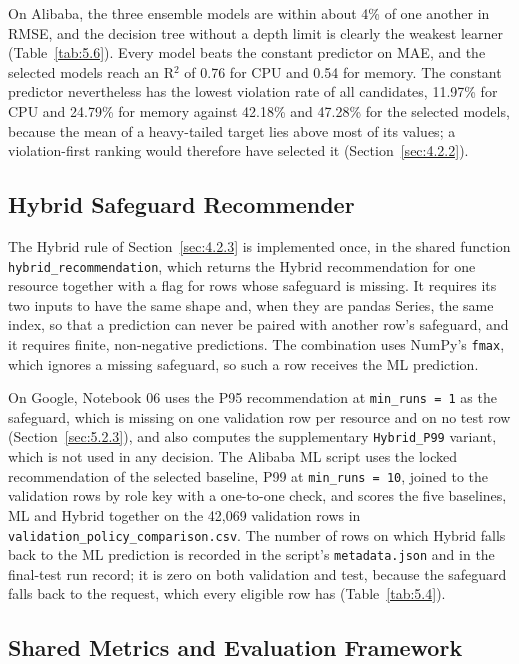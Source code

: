 \documentclass{IEEEtran}
\begin{document}
On Alibaba, the three ensemble models are within about 4\% of one another in RMSE, and the decision tree without a depth limit is clearly the weakest learner (Table~\ref{tab:5.6}). Every model beats the constant predictor on MAE, and the selected models reach an R$^{2}$ of 0.76 for CPU and 0.54 for memory. The constant predictor nevertheless has the lowest violation rate of all candidates, 11.97\% for CPU and 24.79\% for memory against 42.18\% and 47.28\% for the selected models, because the mean of a heavy-tailed target lies above most of its values; a violation-first ranking would therefore have selected it (Section~\ref{sec:4.2.2}).

\subsection{Hybrid Safeguard Recommender}\label{sec:5.4}

The Hybrid rule of Section~\ref{sec:4.2.3} is implemented once, in the shared function \texttt{hybrid\_recommendation}, which returns the Hybrid recommendation for one resource together with a flag for rows whose safeguard is missing. It requires its two inputs to have the same shape and, when they are pandas Series, the same index, so that a prediction can never be paired with another row's safeguard, and it requires finite, non-negative predictions. The combination uses NumPy's \texttt{fmax}, which ignores a missing safeguard, so such a row receives the ML prediction.

On Google, Notebook 06 uses the P95 recommendation at \texttt{min\_runs\ =\ 1} as the safeguard, which is missing on one validation row per resource and on no test row (Section~\ref{sec:5.2.3}), and also computes the supplementary \texttt{Hybrid\_P99} variant, which is not used in any decision. The Alibaba ML script uses the locked recommendation of the selected baseline, P99 at \texttt{min\_runs\ =\ 10}, joined to the validation rows by role key with a one-to-one check, and scores the five baselines, ML and Hybrid together on the 42,069 validation rows in \texttt{validation\_policy\_comparison.csv}. The number of rows on which Hybrid falls back to the ML prediction is recorded in the script's \texttt{metadata.json} and in the final-test run record; it is zero on both validation and test, because the safeguard falls back to the request, which every eligible row has (Table~\ref{tab:5.4}).

\subsection{Shared Metrics and Evaluation Framework}\label{sec:5.5}
\end{document}
